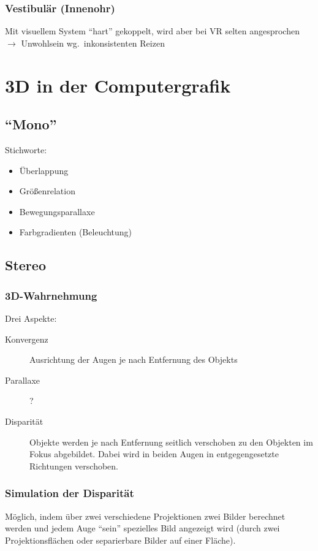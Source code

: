 \documentclass[a4paper, 12pt]{article}
\begin{document}
\subsubsection*{Vestibulär (Innenohr)}
Mit visuellem System ``hart'' gekoppelt, wird aber bei VR selten angesprochen\\
\(\rightarrow\) Unwohlsein wg.\ inkonsistenten Reizen



\section{3D in der Computergrafik}


\subsection[Mono]{``Mono''}
Stichworte:
\begin{itemize}
  \item Überlappung
  \item Größenrelation
  \item Bewegungsparallaxe
  \item Farbgradienten (Beleuchtung)
\end{itemize}


\subsection{Stereo}

\subsubsection*{3D-Wahrnehmung}
Drei Aspekte:
\begin{description}
  \item[Konvergenz] Ausrichtung der Augen je nach Entfernung des Objekts
  \item[Parallaxe] ?
  \item[Disparität] Objekte werden je nach Entfernung seitlich verschoben zu den Objekten im Fokus abgebildet.
    Dabei wird in beiden Augen in entgegengesetzte Richtungen verschoben.
\end{description}

\subsubsection*{Simulation der Disparität}
Möglich, indem über zwei verschiedene Projektionen zwei Bilder berechnet werden und jedem Auge ``sein'' spezielles Bild angezeigt wird (durch zwei Projektionsflächen oder separierbare Bilder auf einer Fläche).
\end{document}
